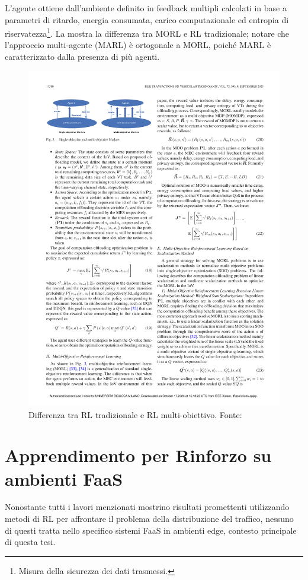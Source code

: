 L'agente ottiene dall'ambiente definito in \cite{Zhang2023} feedback multipli calcolati in base a parametri di ritardo, energia consumata, carico computazionale ed entropia di riservatezza\footnote{Misura della sicurezza dei dati trasmessi.}. La  mostra la differenza tra MORL e RL tradizionale; notare che l'approccio multi-agente (MARL) è ortogonale a MORL, poiché MARL è caratterizzato dalla presenza di più agenti.

\begin{figure}
    \centering
    \includegraphics[width=.8\linewidth]{assets/3/morl_vs_rl.pdf}
    \caption[Differenza tra RL tradizionale e RL multi-obiettivo]{Differenza tra RL tradizionale e RL multi-obiettivo. Fonte: \cite{Zhang2023}}
    \label{fig:2_morl_vs_rl}
\end{figure}

\section{Apprendimento per Rinforzo su ambienti FaaS}

Nonostante tutti i lavori menzionati mostrino risultati promettenti utilizzando metodi di RL per affrontare il problema della distribuzione del traffico, nessuno di questi tratta nello specifico sistemi FaaS in ambienti edge, contesto principale di questa tesi.

